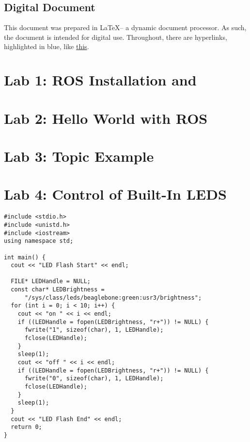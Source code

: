 \documentclass{article}
\let\Oldsection\section
\renewcommand{\section}{\FloatBarrier\Oldsection}
\let\Oldsubsection\subsection
\renewcommand{\subsection}{\FloatBarrier\Oldsubsection}
\def\CC{{C\nolinebreak[4]\hspace{-.05em}\raisebox{.4ex}{\tiny\bf ++}}}
\begin{document}
\subsection*{Digital Document}
This document was prepared in \LaTeX -- a dynamic document processor. As such, the document is intended for digital use. Throughout, there are hyperlinks, highlighted in blue, like \href{https://en.wikipedia.org/wiki/Robot}{this}.
\clearpage
\section{Lab 1: ROS Installation and \protect\CC}
\clearpage
\section{Lab 2: Hello World with ROS}
\clearpage
\section{Lab 3: Topic Example}
\clearpage
\section{Lab 4: Control of Built-In LEDS}
\begin{lstlisting}[style=C++Style]
#include <stdio.h>
#include <unistd.h>
#include <iostream>
using namespace std;

int main() {
  cout << "LED Flash Start" << endl;

  FILE* LEDHandle = NULL;
  const char* LEDBrightness =
      "/sys/class/leds/beaglebone:green:usr3/brightness";
  for (int i = 0; i < 10; i++) {
    cout << "on " << i << endl;
    if ((LEDHandle = fopen(LEDBrightness, "r+")) != NULL) {
      fwrite("1", sizeof(char), 1, LEDHandle);
      fclose(LEDHandle);
    }
    sleep(1);
    cout << "off " << i << endl;
    if ((LEDHandle = fopen(LEDBrightness, "r+")) != NULL) {
      fwrite("0", sizeof(char), 1, LEDHandle);
      fclose(LEDHandle);
    }
    sleep(1);
  }
  cout << "LED Flash End" << endl;
  return 0;
}
\end{lstlisting}

\clearpage
\end{document}
